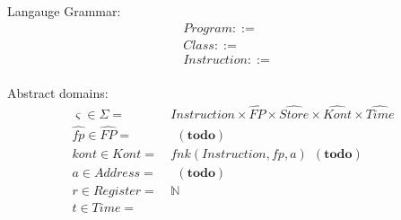 \documentclass{article}
\begin{document}
Langauge Grammar:
\begin{align*}
	Program ::=& \\
	Class ::=& \\
	Instruction ::=& \\
\end{align*}



Abstract domains:
\begin{align*}
	\varsigma \in \Sigma =&\ Instruction \times \widehat{FP} \times \widehat{Store} \times \widehat{Kont} \times \widehat{Time} \\
	\widehat{fp} \in \widehat{FP} =&\ \ \ \mathbf{(todo)}\\
	kont \in Kont =&\ fnk(Instruction, fp, a)\ \ \mathbf{(todo)}\\
	a \in Address =&\ \ \ \mathbf{(todo)} \\
	r \in Register =&\ \mathbb{N} \\
	t \in Time =&\ \\
\end{align*}
\end{document}
